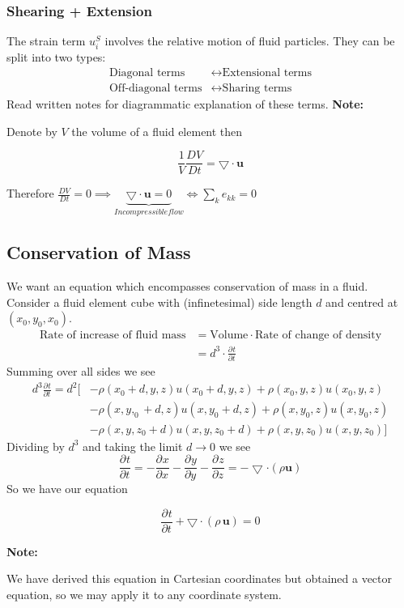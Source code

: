\documentclass[11pt]{article}
\newcommand*{\pd}[3][]{\ensuremath{\frac{\partial^{#1} {#3}}{\partial {#3}^{#1}}}}
\newcommand*{\md}[1]{\ensuremath{\frac{D #1}{D t}}}
\newcommand{\grad}{\bigtriangledown}
\newenvironment{note}
    {\textbf{Note:}\begin{mdframed}[backgroundcolor=white, roundcorner=5pt, linewidth=0pt]}
    {\end{mdframed}}
\newenvironment{formula}
	{\begin{mdframed}[backgroundcolor=white, roundcorner=5pt, linewidth=1pt, linecolor=red]}
	{\end{mdframed}}
\newcommand{\mv}[1]{\textbf{#1}}
\begin{document}
\subsubsection{Shearing + Extension}
The strain term $u_i^S$ involves the relative motion of fluid particles. They can be split into two types:
\begin{align*}
    \text{Diagonal terms} &\longleftrightarrow \text{Extensional terms}\\
    \text{Off-diagonal terms} &\longleftrightarrow \text{Sharing terms}
\end{align*}
Read written notes for diagrammatic explanation of these terms.
\begin{note}
Denote by $V$ the volume of a fluid element then
\begin{formula}
$$\frac{1}{V}\md{V} = \grad\cdot\mv{u}$$
\end{formula}
Therefore $\md{V}=0\implies\underbrace{\grad\cdot\mv{u}=0}_{Incompressible flow}\iff\sum_k e_{kk}=0$
\end{note}

\subsection{Conservation of Mass}
We want an equation which encompasses conservation of mass in a fluid. Consider a fluid element cube with (infinetesimal) side length $d$ and centred at $(x_0,y_0,x_0)$.
\begin{align*}
    \text{Rate of increase of fluid mass} &= \text{Volume} \cdot \text{Rate of change of density}\\
    &= d^3 \cdot \pd{\rho}{t}
\end{align*}
Summing over all sides we see
\begin{align*}
d^3\pd{\rho}{t}=d^2[&-\rho(x_0+d,y,z)u(x_0+d,y,z)+\rho(x_0,y,z)u(x_0,y,z)\\
                    &-\rho(x,y,_0+d,z)u(x,y_0+d,z)+\rho(x,y_0,z)u(x,y_0,z)\\
                    &-\rho(x,y,z_0+d)u(x,y,z_0+d)+\rho(x,y,z_0)u(x,y,z_0)]
\end{align*}
Dividing by $d^3$ and taking the limit $d\to 0$ we see
$$\pd{\rho}{t}=-\pd{(\rho u)}{x} - \pd{(\rho v)}{y} - \pd{(\rho w)}{z} = -\grad\cdot(\rho\mv{u})$$
So we have our equation
\begin{formula}
$$\pd{\rho}{t}+\grad\cdot(\rho\,\mv{u})=0$$
\end{formula}
\begin{note}
	We have derived this equation in Cartesian coordinates but obtained a vector equation, so we may apply it to any coordinate system.
\end{note}
\end{document}
